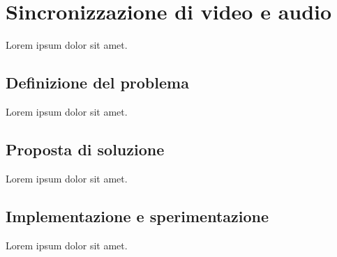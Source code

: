 \chapter{Sincronizzazione di video e audio}
\label{cha:sync}
Lorem ipsum dolor sit amet.

\section{Definizione del problema}
\label{sec:sync_problema}

Lorem ipsum dolor sit amet.

\section{Proposta di soluzione}
\label{sec:sync_soluzione}

Lorem ipsum dolor sit amet.

\section{Implementazione e sperimentazione}
\label{sec:sync_impl}

Lorem ipsum dolor sit amet.

